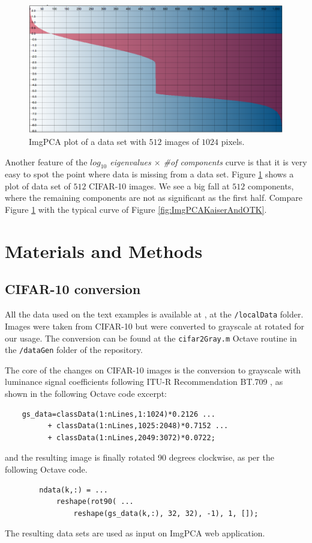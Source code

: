\documentclass{article} %
\begin{document}
\begin{figure}[h]
\begin{center}
\includegraphics[width=\textwidth]{CIFAR10All512Plot.png}
\end{center}
\caption{ImgPCA plot of a data set with $512$ images of $1024$ pixels.}
\label{fig:ImgPCA512}
\end{figure}

Another feature of the \emph{$log_{10}$ eigenvalues $\times$ \#of components} curve is that it is very easy to spot the point where data is missing from a data set. Figure \ref{fig:ImgPCA512} shows a plot of data set of $512$ CIFAR-10 images. We see a big fall at $512$ components, where the remaining components are not as significant as the first half. Compare Figure \ref{fig:ImgPCA512} with the typical curve of Figure \ref{fig:ImgPCAKaiserAndOTK}.

\section{Materials and Methods}\label{materials}
\subsection{CIFAR-10 conversion}
All the data used on the text examples is available at \citet{Stelling:aa}, at the \texttt{/localData} folder. Images were taken from CIFAR-10 \citep{krizhevsky2009learning} but were converted to grayscale at rotated  for our usage. The conversion can be found at the \texttt{cifar2Gray.m} Octave routine in the \texttt{/dataGen} folder of the \citet{Stelling:aa} repository.\par

The core of the changes on CIFAR-10 images is the conversion to grayscale with luminance signal coefficients following ITU-R Recommendation BT.709 \citep{ITU-R:2015aa}, as shown in the following Octave code excerpt:
\begin{verbatim}
    gs_data=classData(1:nLines,1:1024)*0.2126 ...
          + classData(1:nLines,1025:2048)*0.7152 ...
          + classData(1:nLines,2049:3072)*0.0722;
\end{verbatim}
and the resulting image is finally rotated 90 degrees clockwise, as per the following Octave code.
\begin{verbatim}
        ndata(k,:) = ...
            reshape(rot90( ...
                reshape(gs_data(k,:), 32, 32), -1), 1, []);
\end{verbatim}
The resulting data sets are used as input on ImgPCA web application.
\end{document}
